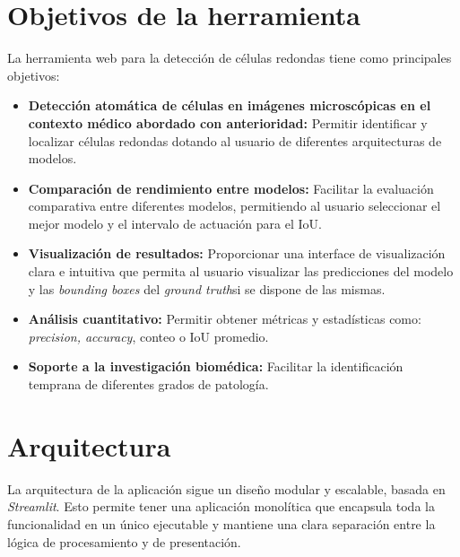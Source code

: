 \documentclass[12pt,a4paper,onecolumn,oneside]{report}
\begin{document}
\section{Objetivos de la herramienta}
\label{sec:Objetivos de la herramienta}

La herramienta web para la detección de células redondas tiene como principales objetivos:

\begin{itemize}
  \item{\textbf{Detección atomática de células en imágenes microscópicas en el contexto médico abordado con anterioridad:} Permitir identificar
  y localizar células redondas dotando al usuario de diferentes arquitecturas de modelos.}
  \item{\textbf{Comparación de rendimiento entre modelos:} Facilitar la evaluación comparativa entre diferentes modelos,
  permitiendo al usuario seleccionar el mejor modelo y el intervalo de actuación para el IoU.}
  \item{\textbf{Visualización de resultados:} Proporcionar una interface de visualización clara e intuitiva que permita al usuario 
  visualizar las predicciones del modelo y las \textit{bounding boxes} del \textit{ground truth}si se dispone de las mismas.}
  \item{\textbf{Análisis cuantitativo:} Permitir obtener métricas y estadísticas como: \textit{precision, accuracy}, conteo o IoU promedio}.
  \item{\textbf{Soporte a la investigación biomédica:} Facilitar la identificación temprana de diferentes grados de patología.} 
\end{itemize}

\section{Arquitectura}
\label{sec:Arquitectura}
La arquitectura de la aplicación sigue un diseño modular y escalable, basada en \textit{Streamlit}. Esto permite tener una aplicación monolítica que encapsula toda la funcionalidad en un único ejecutable y mantiene 
una clara separación entre la lógica de procesamiento y de presentación.
\end{document}
